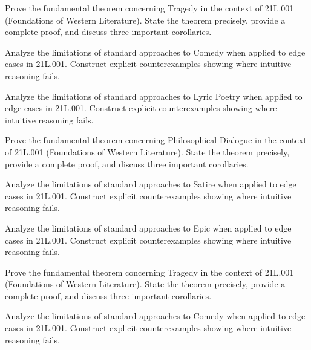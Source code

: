 \documentclass[12pt,a4paper]{exam}
\begin{document}
\begin{questions}
\question[4]
Prove the fundamental theorem concerning Tragedy in the context of 21L.001 (Foundations of Western Literature). State the theorem precisely, provide a complete proof, and discuss three important corollaries.

\vspace{0.3cm}

\question[4]
Analyze the limitations of standard approaches to Comedy when applied to edge cases in 21L.001. Construct explicit counterexamples showing where intuitive reasoning fails.

\vspace{0.3cm}

\question[4]
Analyze the limitations of standard approaches to Lyric Poetry when applied to edge cases in 21L.001. Construct explicit counterexamples showing where intuitive reasoning fails.

\vspace{0.3cm}

\question[4]
Prove the fundamental theorem concerning Philosophical Dialogue in the context of 21L.001 (Foundations of Western Literature). State the theorem precisely, provide a complete proof, and discuss three important corollaries.

\vspace{0.3cm}

\question[3]
Analyze the limitations of standard approaches to Satire when applied to edge cases in 21L.001. Construct explicit counterexamples showing where intuitive reasoning fails.

\vspace{0.3cm}

\question[2]
Analyze the limitations of standard approaches to Epic when applied to edge cases in 21L.001. Construct explicit counterexamples showing where intuitive reasoning fails.

\vspace{0.3cm}

\question[2]
Prove the fundamental theorem concerning Tragedy in the context of 21L.001 (Foundations of Western Literature). State the theorem precisely, provide a complete proof, and discuss three important corollaries.

\vspace{0.3cm}

\question[3]
Analyze the limitations of standard approaches to Comedy when applied to edge cases in 21L.001. Construct explicit counterexamples showing where intuitive reasoning fails.


\end{questions}
\end{document}
